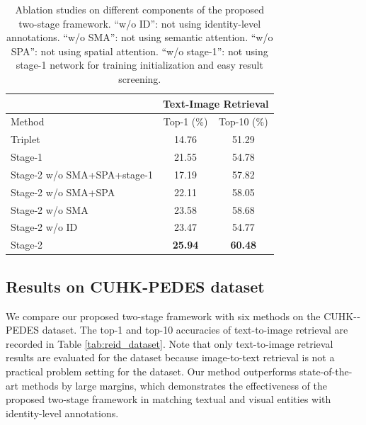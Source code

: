 \begin{table}[]
	\small
	\centering
	\begin{tabular}{|l|c|c|}
		\hline
		& \multicolumn{2}{c|}{Text-Image Retrieval} \\ \hline
		Method                        & Top-1 (\%)        & Top-10 (\%)              \\ \hline
		Triplet      & 14.76             & 51.29              \\ \hline
		Stage-1                       & 21.55             & 54.78              \\ \hline
		Stage-2 w/o SMA+SPA+stage-1  & 17.19             & 57.82             \\ \hline
		Stage-2 w/o SMA+SPA        & 22.11             & 58.05             \\ \hline
		Stage-2 w/o SMA             & 23.58             & 58.68             \\ \hline
		Stage-2 w/o ID              & 23.47             & 54.77             \\ \hline
		Stage-2                       & {\textbf{25.94}}    & {\textbf{60.48}}   \\ \hline
	\end{tabular}
	\caption{Ablation studies on different components of the proposed two-stage framework. ``w/o ID'': not using identity-level annotations. ``w/o SMA'': not using semantic attention. ``w/o SPA'': not using spatial attention. ``w/o stage-1'': not using stage-1 network for training initialization and easy result screening.}
	\label{tab:ablationtexval}
\end{table}

\subsection{Results on CUHK-PEDES dataset}

We compare our proposed two-stage framework with six methods on the CUHK-­PEDES dataset. The top-1 and top-10 accuracies of text-to-image retrieval are recorded in Table \ref{tab:reid_dataset}. 
Note that only text-to-image retrieval results are evaluated for the dataset because image-to-text retrieval is not a practical problem setting for the dataset.
Our method outperforms state-of-the-art methods by large margins, which demonstrates the effectiveness of the proposed two-stage framework in matching textual and visual entities with identity-level annotations.

